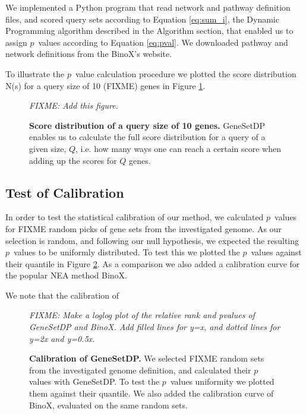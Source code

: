 \documentclass[a4paper,american]{lipics-v2016}
\begin{document}
We implemented a Python program that read network and pathway definition files, and scored query sets according to Equation \ref{eq:sum_i}, the Dynamic Programming algorithm described in the Algorithm section, that enabled us to assign $p$~values according to Equation \ref{eq:pval}. We downloaded pathway and network definitions from the BinoX's website.

To illustrate the $p$~value calculation procedure we plotted the score distribution N(s) for a query size of 10 (FIXME) genes in Figure \ref{fig:score_dist}.

\begin{figure}[htb]
  {\em FIXME: Add this figure.}
  \caption{{\bf Score distribution of a query size of 10 genes.} GeneSetDP enables us to calculate the full score distribution for a query of a given size, $Q$, i.e. how many ways one can reach a certain score when adding up the scores for $Q$ genes.}
  \label{fig:score_dist}
\end{figure}

\subsection*{Test of Calibration}

In order to test the statistical calibration of our method, we calculated $p$~values for FIXME random picks of gene sets from the investigated genome. As our selection is random, and following our null hypothesis, we expected the resulting $p$~values to be uniformly distributed. To test this we plotted the $p$~values against their quantile in Figure \ref{fig:calibration}. As a comparison we also added a calibration curve for the popular NEA method BinoX\cite{ogris2016novel}.

We note that the calibration of

\begin{figure}[htb]
  {\em FIXME: Make a loglog plot of the relative rank and pvalues of GeneSetDP and BinoX. Add filled lines for y=x, and dotted lines for y=2x and y=0.5x.}
  \caption{{\bf Calibration of GeneSetDP.} We selected FIXME random sets from the investigated genome definition, and calculated their $p$ values with GeneSetDP. To test the $p$~values uniformity we plotted them against their quantile. We also added the calibration curve of BinoX, evaluated on the same random sets.}
  \label{fig:calibration}
\end{figure}
\end{document}
